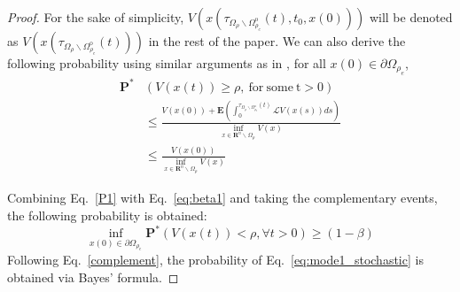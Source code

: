 \documentclass[letterpaper, 10pt, conference]{ieeeconf}
\begin{document}
\begin{proof}
For the sake of simplicity, $V(x(\tau_{\Omega_{\rho} \backslash \Omega_{\rho_e}^{\text{o}}}(t),t_0,x(0)))$ will be denoted as $V(x(\tau_{\Omega_{\rho} \backslash \Omega_{\rho_e}^{\text{o}}}(t)))$ in the rest of the paper. We can also derive the following probability using similar arguments as in \cite{battilotti2003stabilization}, for all $x(0) \in \partial \Omega_{\rho_e}$,
\begin{subequations}\label{P1}
	\begin{align}
	\mathbf{P}^*&(V(x(t)) \geq \rho,~\mathrm{for~some~t} >0 ) \nonumber\\
	&\leq \frac{V(x(0)) + \mathbf{E}(\int_{0}^{\tau_{\Omega_\rho \backslash \Omega_{\rho_e}^{\text{o}}}(t)} \mathcal{L}V(x(s))ds)}{\inf_{x \in \mathbf{R}^n \backslash {\Omega_{\rho} }} V(x)}\label{P1:1}\\ 
	&\leq \frac{V(x(0))}{\inf_{x \in \mathbf{R}^n \backslash {\Omega_{\rho} }} V(x)}\label{P1:2}
	\end{align}
\end{subequations}



Combining Eq.~\ref{P1} with Eq.~\ref{eq:beta1} and taking the complementary events, the following probability is obtained:
\begin{equation}\label{complement}
\inf \limits_{x(0) \in \partial{\Omega_{\rho_e}} }\mathbf{P}^*(V(x(t)) < \rho, \forall t >0 ) \geq (1-\beta)
\end{equation}
Following Eq.~\ref{complement}, the probability of Eq.~\ref{eq:mode1_stochastic} is obtained via Bayes' formula.



\end{proof}
\end{document}
